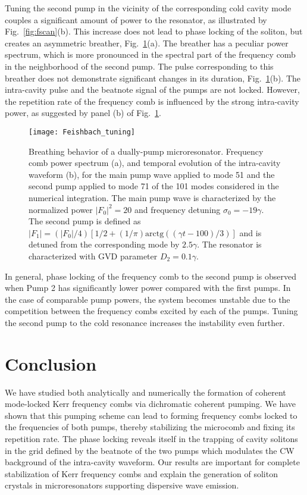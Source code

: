 Tuning the second pump in the vicinity of the corresponding cold cavity mode couples a significant amount of power to the resonator, as illustrated by Fig.~\ref{fig:fscan}(b). This increase does not lead to phase locking of the soliton, but creates an asymmetric breather, Fig.~\ref{fig:feshbach}(a). The breather has a peculiar power spectrum, which is more pronounced in the spectral part of the frequency comb in the neighborhood of the second pump. The pulse corresponding to this breather does not demonstrate significant changes in its duration, Fig.~\ref{fig:feshbach}(b). The intra-cavity pulse and the beatnote signal of the pumps are not locked. However, the repetition rate of the frequency comb is influenced by the strong intra-cavity power, as suggested by panel (b) of Fig.~\ref{fig:feshbach}.
%
\begin{figure}[tbp]
  \centering
  \texttt{[image: Feishbach\_tuning]}
\caption{ \small Breathing behavior of a dually-pump microresonator. Frequency comb power spectrum (a), and temporal evolution of the intra-cavity waveform (b), for the main pump wave applied to mode 51 and the second pump applied to mode 71 of the 101 modes considered in the numerical integration. The main pump wave is characterized by the normalized power $|F_0|^2=20$ and frequency detuning $\sigma_0 = -19 \gamma$. The second pump is defined as $|F_1|=(|F_0|/4)[1/2 + (1/\pi) \mathrm{arctg}((\gamma t-100)/3)]$ and is detuned from the corresponding mode by $2.5 \gamma$. The resonator is characterized with GVD parameter $D_2=0.1 \gamma$. 
} \label{fig:feshbach}
\end{figure}
%

In general, phase locking of the frequency comb to the second pump is observed when Pump 2 has significantly lower power compared with the first pumps. In the case of comparable pump powers, the system becomes unstable due to the competition between the frequency combs excited by each of the pumps. Tuning the second pump to the cold resonance increases the instability even further.

\section{Conclusion}
\label{sec:conclusion}
We have studied both analytically and numerically the formation of coherent mode-locked Kerr frequency combs via dichromatic coherent pumping. We have shown that this pumping scheme can lead to forming frequency combs locked to the frequencies of both pumps, thereby stabilizing the microcomb and fixing its repetition rate. The phase locking reveals itself in the trapping of cavity solitons in the grid defined by the beatnote of the two pumps which modulates the CW background of the intra-cavity waveform. Our results are important for complete stabilization of Kerr frequency combs and explain the generation of soliton crystals in microresonators supporting dispersive wave emission.

